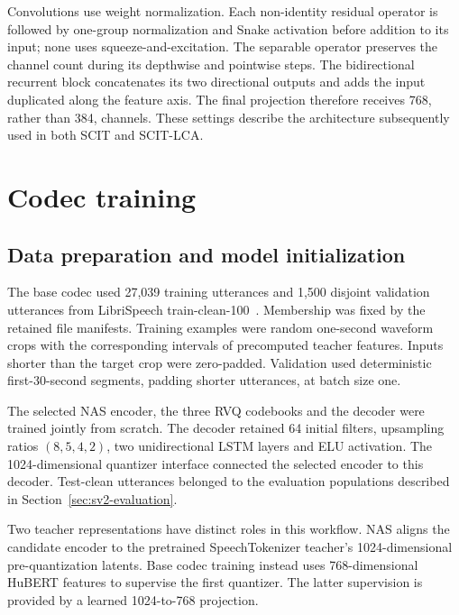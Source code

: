 Convolutions use weight normalization. Each non-identity residual operator is followed by one-group normalization and Snake activation before addition to its input; none uses squeeze-and-excitation. The separable operator preserves the channel count during its depthwise and pointwise steps. The bidirectional recurrent block concatenates its two directional outputs and adds the input duplicated along the feature axis. The final projection therefore receives 768, rather than 384, channels. These settings describe the architecture subsequently used in both SCIT and SCIT-LCA.

\section{Codec training}
\label{sec:sv2-training}

\subsection{Data preparation and model initialization}
The base codec used 27,039 training utterances and 1,500 disjoint validation utterances from LibriSpeech train-clean-100~\cite{librispeech}. Membership was fixed by the retained file manifests. Training examples were random one-second waveform crops with the corresponding intervals of precomputed teacher features. Inputs shorter than the target crop were zero-padded. Validation used deterministic first-30-second segments, padding shorter utterances, at batch size one.

The selected NAS encoder, the three RVQ codebooks and the decoder were trained jointly from scratch. The decoder retained 64 initial filters, upsampling ratios $(8,5,4,2)$, two unidirectional LSTM layers and ELU activation. The 1024-dimensional quantizer interface connected the selected encoder to this decoder. Test-clean utterances belonged to the evaluation populations described in Section~\ref{sec:sv2-evaluation}.

Two teacher representations have distinct roles in this workflow. NAS aligns the candidate encoder to the pretrained SpeechTokenizer teacher's 1024-dimensional pre-quantization latents. Base codec training instead uses 768-dimensional HuBERT features to supervise the first quantizer. The latter supervision is provided by a learned 1024-to-768 projection.

